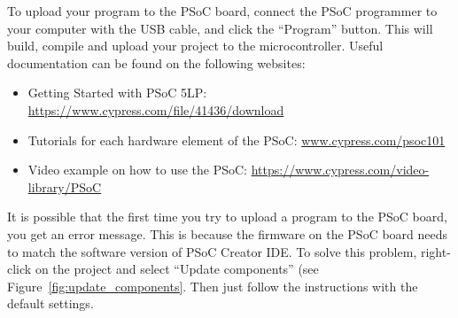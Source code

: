 To upload your program to the PSoC board, connect the PSoC programmer to your computer with the USB cable, and click the ``Program'' button. This will build, compile and upload your project to the microcontroller. Useful documentation can be found on the following websites: 
\begin{itemize}
	\item Getting Started with PSoC 5LP: \url{https://www.cypress.com/file/41436/download}
	\item Tutorials for each hardware element of the PSoC: \url{www.cypress.com/psoc101}
  \item Video example on how to use the PSoC: \url{https://www.cypress.com/video-library/PSoC}
\end{itemize}
It is possible that the first time you try to upload a program to the PSoC board, you get an error message. This is because the firmware on the PSoC board needs to match the software version of PSoC Creator IDE. To solve this problem, right-click on the project and select ``Update components'' (see Figure~\ref{fig:update_components}. Then just follow the instructions with the default settings. 